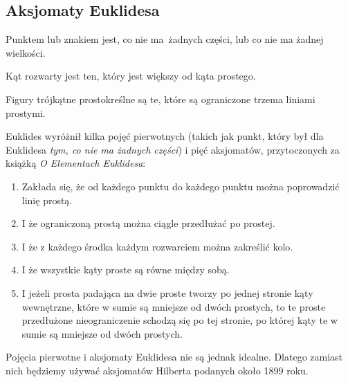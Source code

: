 \subsection{Aksjomaty Euklidesa}

\begin{euclidelement}[opisanie 1.1]
	Punktem lub znakiem jest, co nie ma żadnych części, lub co nie ma żadnej wielkości.
\end{euclidelement}

\begin{euclidelement}[opisanie 1.11]
	Kąt rozwarty jest ten, który jest większy od kąta prostego.
\end{euclidelement}

\begin{euclidelement}[opisanie 1.21]
	Figury trójkątne prostokreślne są te, które są ograniczone trzema liniami prostymi.
\end{euclidelement}


{\color{red}
Euklides wyróżnił kilka pojęć pierwotnych (takich jak punkt, który był dla Euklidesa \emph{tym, co nie ma żadnych części}) i pięć aksjomatów, przytoczonych za książką \emph{O Elementach Euklidesa}:

\begin{enumerate}
	\item Zakłada się, że od każdego punktu do każdego punktu można poprowadzić linię prostą.
	\item I że ograniczoną prostą można ciągle przedłużać po prostej.
	\item I że z każdego środka każdym rozwarciem można zakreślić kolo.
	\item I że wszystkie kąty proste są równe między sobą.
	\item I jeżeli prosta padająca na dwie proste tworzy po jednej stronie kąty wewnętrzne, które w sumie są mniejsze od dwóch prostych, to te proste przedłużone nieograniczenie schodzą się po tej stronie, po której kąty te w sumie są mniejsze od dwóch prostych.
\end{enumerate}

Pojęcia pierwotne i aksjomaty Euklidesa nie są jednak idealne.
Dlatego zamiast nich będziemy używać aksjomatów Hilberta podanych około 1899 roku.
}